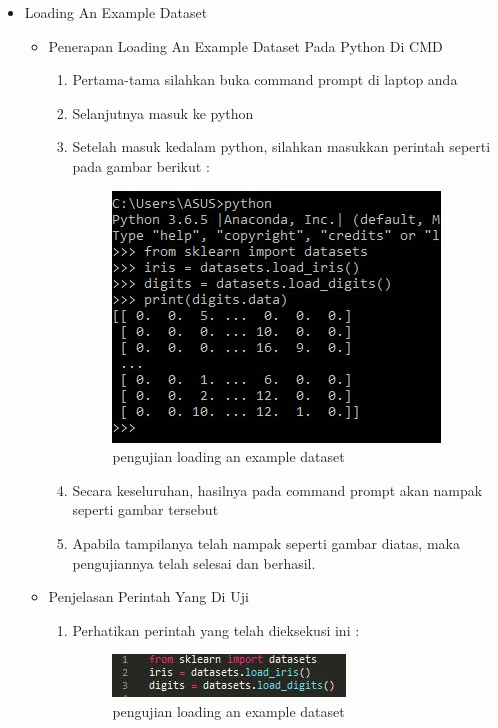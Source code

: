 \par
\begin{itemize}
\item Loading An Example Dataset
\begin{itemize}
\item Penerapan Loading An Example Dataset Pada Python Di CMD
\begin{enumerate}
\item Pertama-tama silahkan buka command prompt di laptop anda
\item Selanjutnya masuk ke python
\item Setelah masuk kedalam python, silahkan masukkan perintah seperti pada gambar berikut :

\begin{figure}[ht]
\centering
\includegraphics[scale=0.6]{figures/4.JPG}
\caption{pengujian loading an example dataset}
\label{contoh}
\end{figure}

\par
\item Secara keseluruhan, hasilnya pada command prompt akan nampak seperti gambar tersebut
\item Apabila tampilanya telah nampak seperti gambar diatas, maka pengujiannya telah selesai dan berhasil.
\end{enumerate}

\par
\item Penjelasan Perintah Yang Di Uji
\begin{enumerate}
\item Perhatikan perintah yang telah dieksekusi ini :

\par
\begin{figure}[ht]
\centering
\includegraphics[scale=0.9]{figures/ok4.JPG}
\caption{pengujian loading an example dataset}
\label{contoh}
\end{figure}
\par


\end{enumerate}
\end{itemize}
\end{itemize}
